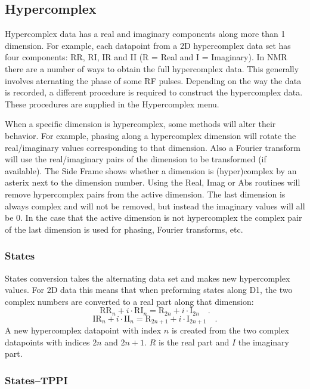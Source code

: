 \documentclass[11pt,a4paper]{article}
\begin{document}
\subsection{Hypercomplex}
Hypercomplex data has a real and imaginary components along more than 1 dimension.
For example, each datapoint from a 2D hypercomplex data set has four components: RR, RI, IR and II (R = Real and I = Imaginary).
In NMR there are a number of ways to obtain the full hypercomplex data.
This generally involves aternating the phase of some RF pulses.
Depending on the way the data is recorded, a different procedure is required to construct the hypercomplex data.
These procedures are supplied in the Hypercomplex menu.

When a specific dimension is hypercomplex, some methods will alter their behavior.
For example, phasing along a hypercomplex dimension will rotate the real/imaginary values corresponding to that dimension.
Also a Fourier transform will use the real/imaginary pairs of the dimension to be transformed (if available).
The Side Frame shows whether a dimension is (hyper)complex by an asterix next to the dimension number.
Using the Real, Imag or Abs routines will remove hypercomplex pairs from the active dimension.
The last dimension is always complex and will not be removed, but instead the imaginary values will all be 0.
In the case that the active dimension is not hypercomplex the complex pair of the last dimension is used for phasing, Fourier transforms, etc. 

\subsubsection{States}
States conversion takes the alternating data set and makes new hypercomplex values.
For 2D data this means that when preforming states along D1, the two complex numbers are converted to a real part along that dimension:
\begin{equation*}
  \text{RR}_n + i \cdot \text{RI}_n = \text{R}_{2n} + i \cdot \text{I}_{2n} \quad .
\end{equation*}
\begin{equation*}
  \text{IR}_n + i \cdot \text{II}_n = \text{R}_{2n+1} + i \cdot \text{I}_{2n+1} \quad .
\end{equation*}
A new hypercomplex datapoint with index $n$ is created from the two complex datapoints with indices $2n$ and $2n+1$.
$R$ is the real part and $I$ the imaginary part.

\subsubsection{States--TPPI}
\end{document}
